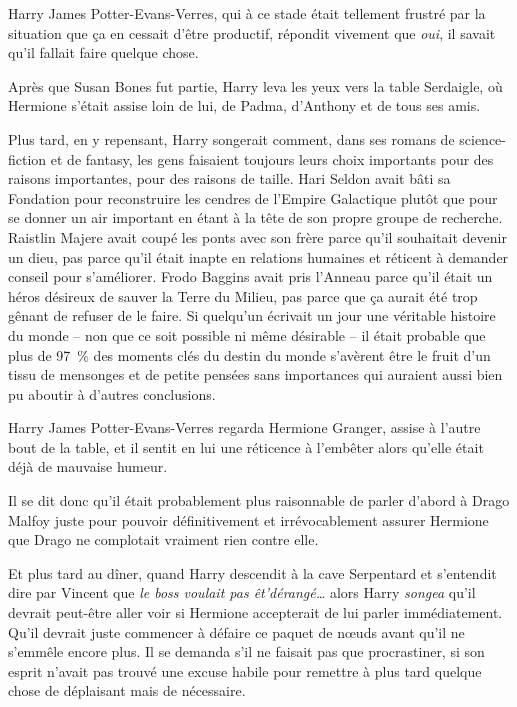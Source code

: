 Harry James Potter-Evans-Verres, qui à ce stade était tellement frustré par la situation que ça en cessait d'être productif, répondit vivement que \emph{oui}, il savait qu'il fallait faire quelque chose.

Après que Susan Bones fut partie, Harry leva les yeux vers la table Serdaigle, où Hermione s'était assise loin de lui, de Padma, d'Anthony et de tous ses amis.

Plus tard, en y repensant, Harry songerait comment, dans ses romans de science-fiction et de fantasy, les gens faisaient toujours leurs choix importants pour des raisons importantes, pour des raisons de taille. Hari Seldon avait bâti sa Fondation pour reconstruire les cendres de l'Empire Galactique plutôt que pour se donner un air important en étant à la tête de son propre groupe de recherche. Raistlin Majere avait coupé les ponts avec son frère parce qu'il souhaitait devenir un dieu, pas parce qu'il était inapte en relations humaines et réticent à demander conseil pour s'améliorer. Frodo Baggins avait pris l'Anneau parce qu'il était un héros désireux de sauver la Terre du Milieu, pas parce que ça aurait été trop gênant de refuser de le faire. Si quelqu'un écrivait un jour une véritable histoire du monde -- non que ce soit possible ni même désirable -- il était probable que plus de 97~\% des moments clés du destin du monde s'avèrent être le fruit d'un tissu de mensonges et de petite pensées sans importances qui auraient aussi bien pu aboutir à d'autres conclusions.

Harry James Potter-Evans-Verres regarda Hermione Granger, assise à l'autre bout de la table, et il sentit en lui une réticence à l'embêter alors qu'elle était déjà de mauvaise humeur.

Il se dit donc qu'il était probablement plus raisonnable de parler d'abord à Drago Malfoy juste pour pouvoir définitivement et irrévocablement assurer Hermione que Drago ne complotait vraiment rien contre elle.

Et plus tard au dîner, quand Harry descendit à la cave Serpentard et s'entendit dire par Vincent que \emph{le boss voulait pas êt'dérangé…} alors Harry \emph{songea} qu'il devrait peut-être aller voir si Hermione accepterait de lui parler immédiatement. Qu'il devrait juste commencer à défaire ce paquet de nœuds avant qu'il ne s'emmêle encore plus. Il se demanda s'il ne faisait pas que procrastiner, si son esprit n'avait pas trouvé une excuse habile pour remettre à plus tard quelque chose de déplaisant mais de nécessaire.

